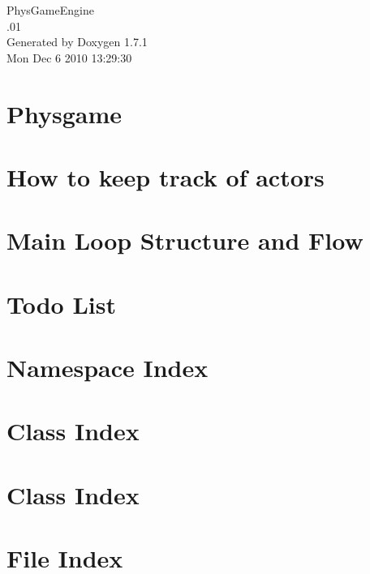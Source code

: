 \documentclass[a4paper]{book}
\begin{document}
\hypersetup{pageanchor=false}
\begin{titlepage}
\vspace*{7cm}
\begin{center}
{\Large PhysGameEngine \\[1ex]\large .01 }\\
\vspace*{1cm}
{\large Generated by Doxygen 1.7.1}\\
\vspace*{0.5cm}
{\small Mon Dec 6 2010 13:29:30}\\
\end{center}
\end{titlepage}
\clearemptydoublepage
{}
\tableofcontents
\clearemptydoublepage
{}
\hypersetup{pageanchor=true}
\chapter{Physgame}
\label{index}\hypertarget{index}{}
\chapter{How to keep track of actors}
\label{actorcontainer1}
\hypertarget{actorcontainer1}{}

\chapter{Main Loop Structure and Flow}
\label{mainloop1}
\hypertarget{mainloop1}{}

\chapter{Todo List}
\label{todo}
\hypertarget{todo}{}

\chapter{Namespace Index}

\chapter{Class Index}

\chapter{Class Index}

\chapter{File Index}

\end{document}
